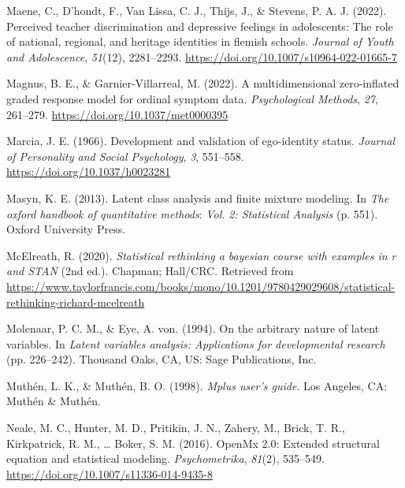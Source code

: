 \documentclass[
  ,man,floatsintext]{apa6}
\newlength{\cslhangindent}
\newlength{\cslentryspacingunit} %
\newenvironment{CSLReferences}[2] %
 {%
  \setlength{\parindent}{0pt}
  \ifodd #1
  \let\oldpar\par
  \def\par{\hangindent=\cslhangindent\oldpar}
  \fi
  \setlength{\parskip}{#2\cslentryspacingunit}
 }%
 {}
\begin{document}
\begin{CSLReferences}{1}{0}
\leavevmode{}%
Maene, C., D'hondt, F., Van Lissa, C. J., Thijs, J., \& Stevens, P. A. J. (2022). Perceived teacher discrimination and depressive feelings in adolescents: The role of national, regional, and heritage identities in flemish schools. \emph{Journal of Youth and Adolescence}, \emph{51}(12), 2281--2293. \url{https://doi.org/10.1007/s10964-022-01665-7}

\leavevmode{}%
Magnus, B. E., \& Garnier-Villarreal, M. (2022). A multidimensional zero-inflated graded response model for ordinal symptom data. \emph{Psychological Methods}, \emph{27}, 261--279. \url{https://doi.org/10.1037/met0000395}

\leavevmode{}%
Marcia, J. E. (1966). Development and validation of ego-identity status. \emph{Journal of Personality and Social Psychology}, \emph{3}, 551--558. \url{https://doi.org/10.1037/h0023281}

\leavevmode{}%
Masyn, K. E. (2013). Latent class analysis and finite mixture modeling. In \emph{The oxford handbook of quantitative methods}: \emph{Vol.} \emph{2: Statistical Analysis} (p. 551). Oxford University Press.

\leavevmode{}%
McElreath, R. (2020). \emph{Statistical rethinking {\textbar} a bayesian course with examples in r and {STAN}} (2nd ed.). Chapman; Hall/{CRC}. Retrieved from \url{https://www.taylorfrancis.com/books/mono/10.1201/9780429029608/statistical-rethinking-richard-mcelreath}

\leavevmode{}%
Molenaar, P. C. M., \& Eye, A. von. (1994). On the arbitrary nature of latent variables. In \emph{Latent variables analysis: Applications for developmental research} (pp. 226--242). Thousand Oaks, {CA}, {US}: Sage Publications, Inc.

\leavevmode{}%
Muthén, L. K., \& Muthén, B. O. (1998). \emph{Mplus user's guide}. Los Angeles, {CA}: Muthén \& Muthén.

\leavevmode{}%
Neale, M. C., Hunter, M. D., Pritikin, J. N., Zahery, M., Brick, T. R., Kirkpatrick, R. M., \ldots{} Boker, S. M. (2016). {OpenMx} 2.0: Extended structural equation and statistical modeling. \emph{Psychometrika}, \emph{81}(2), 535--549. \url{https://doi.org/10.1007/s11336-014-9435-8}


\end{CSLReferences}
\end{document}
